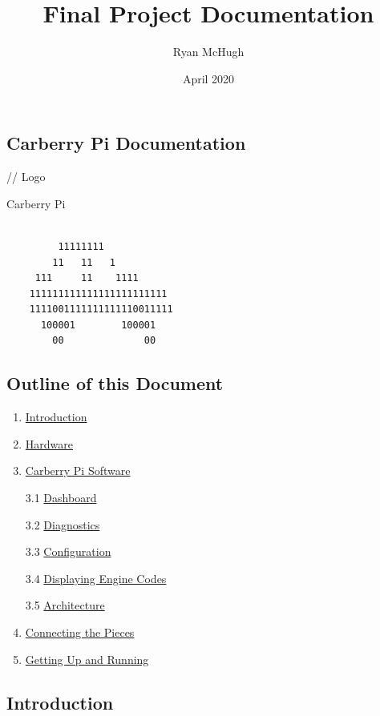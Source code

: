 \documentclass{article}
\title{Final Project Documentation}
\author{Ryan McHugh}
\date{April 2020}
\begin{document}
\maketitle

\setcounter{secnumdepth}{1}

\hypertarget{carberry-pi-documentation}{%
\subsection{Carberry Pi Documentation}\label{carberry-pi-documentation}}

// Logo

Carberry Pi

\begin{verbatim}

         11111111
        11   11   1
     111     11    1111
    111111111111111111111111
    1111001111111111110011111
      100001        100001
        00              00            
\end{verbatim}

\hypertarget{outline-of-this-document}{%
\subsection{Outline of this Document}\label{outline-of-this-document}}

\begin{enumerate}
\def\labelenumi{\arabic{enumi}.}
\item
  \protect\hyperlink{introduction}{Introduction}
\item
  \protect\hyperlink{hardware}{Hardware}
\item
  \protect\hyperlink{software}{Carberry Pi Software}

  3.1 \protect\hyperlink{dashboard}{Dashboard}

  3.2 \protect\hyperlink{diagnostics}{Diagnostics}

  3.3 \protect\hyperlink{configuration}{Configuration}

  3.4 \protect\hyperlink{displaying-engine-codes}{Displaying Engine
  Codes}

  3.5 \protect\hyperlink{architecture}{Architecture}
\item
  \protect\hyperlink{connecting-the-pieces}{Connecting the Pieces}
\item
  \protect\hyperlink{getting-up-and-running}{Getting Up and Running}
\end{enumerate}

\hypertarget{introduction}{%
\subsection{Introduction}\label{introduction}}
\end{document}
